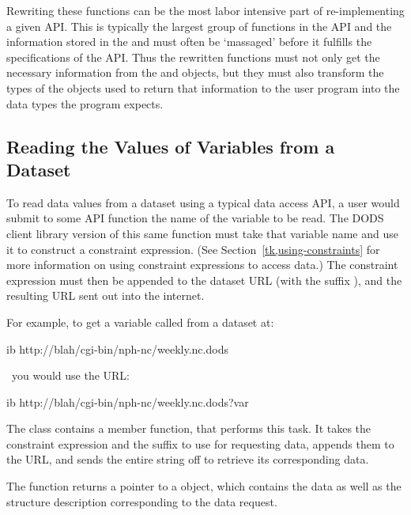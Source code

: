 Rewriting these functions can be the most labor intensive part of
re-imple\-menting a given API. This is typically the largest group of
functions in the API and the information stored in the  and
 must often be `massaged' before it fulfills the
specifications of the API. Thus the rewritten functions must not only
get the necessary information from the  and 
objects, but they must also transform the types of the objects used to
return that information to the user program into the data types the
program expects.

\subsection{Reading the Values of Variables from a Dataset}

To read data values from a dataset using a typical data access API, a
user would submit to some API function the name of the variable to be
read.  The DODS client library version of this same function must take
that variable name and use it to construct a constraint expression.
(See Section~\ref{tk,using-constraints} for more information on using
constraint expressions to access data.)  The constraint expression
must then be appended to the dataset URL (with the suffix
), and the resulting URL sent out into the internet.

For example, to get a variable called  from a dataset at:

\begin{vcode}{ib}
http://blah/cgi-bin/nph-nc/weekly.nc.dods
\end{vcode}

\noindent~you would use the URL:

\begin{vcode}{ib}
http://blah/cgi-bin/nph-nc/weekly.nc.dods?var
\end{vcode}

The  class contains a member function,
 that performs this task. It takes the constraint
expression and the suffix to use for requesting data, appends them to
the  URL, and sends the entire string off to retrieve
its corresponding data.

The  function returns a pointer to a 
object, which contains the data as well as the structure description
corresponding to the data request.

